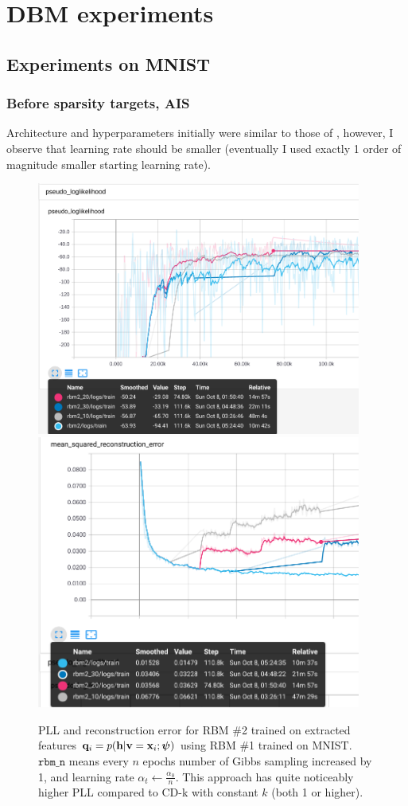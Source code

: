 \newpage
\section{DBM experiments}
\subsection{Experiments on MNIST}
\subsubsection{Before sparsity targets, AIS}
Architecture and hyperparameters initially were similar to those of \cite{dbm_code}, however, I observe that learning rate should be smaller (eventually I used exactly 1 order of magnitude smaller starting learning rate).
\clearpage

\begin{figure}[h]
\begin{mdframed}
\centering
\includegraphics[width=4.2in]{dbm-mnist/rbm2_pll.png}
\\[1em]
\includegraphics[width=4.2in]{dbm-mnist/rbm2_msre.png}
\caption{PLL and reconstruction error for RBM \#2 trained on extracted features $\mathbf{q}_i=p(\mathbf{h}|\mathbf{v}=\mathbf{x}_i; \boldsymbol{\psi})$ using RBM \#1 trained on MNIST. $\texttt{rbm\_n}$ means every $n$ epochs number of Gibbs sampling increased by 1, and learning rate $\alpha_t\leftarrow \frac{\alpha_0}{n}$. This approach \cite{dbm_code, salakhutdinov2007restricted} has quite noticeably higher PLL compared to CD-k with constant $k$ (both 1 or higher).}
\end{mdframed}
\end{figure}

